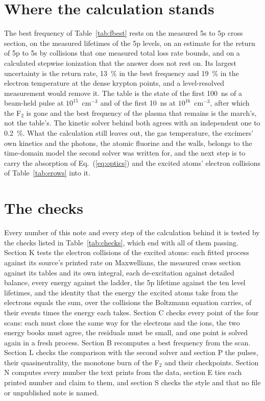 \documentclass[11pt]{article}
\begin{document}
\section{Where the calculation stands}
\label{sec:stands}

The best frequency of Table~\ref{tab:fbest} rests on the measured 5s to 5p cross section, on the measured
lifetimes of the 5p levels, on an estimate for the return of 5p to 5s by collisions that one measured total loss
rate bounds, and on a calculated stepwise ionization that the answer does not rest on. Its largest uncertainty is
the return rate, 13~\% in the best frequency and 19~\% in the electron temperature at the dense krypton points,
and a level-resolved measurement would remove it. The table is the state of the first 100~ns of a beam-held pulse
at $10^{15}$~cm$^{-3}$ and of the first 10~ns at $10^{16}$~cm$^{-3}$, after which the F$_2$ is gone and the best
frequency of the plasma that remains is the march's, not the table's. The kinetic solver behind both agrees with an
independent one to 0.2~\%. What the calculation still leaves out, the gas temperature, the excimers' own kinetics
and the photons, the atomic fluorine and the walls, belongs to the time-domain model the second solver was written
for, and the next step is to carry the absorption of Eq.~(\ref{eq:optics}) and the excited atoms' electron
collisions of Table~\ref{tab:erows} into it.

\FloatBarrier
\appendix
\section{The checks}
\label{app:checks}

Every number of this note and every step of the calculation behind it is tested by the checks listed in
Table~\ref{tab:checks}, which end with all of them passing. Section K tests the electron collisions of the excited
atoms: each fitted process against its source's printed rate on Maxwellians, the measured cross section against
its tables and its own integral, each de-excitation against detailed balance, every energy against the ladder, the
5p lifetime against the ten level lifetimes, and the identity that the energy the excited atoms take from the
electrons equals the sum, over the collisions the Boltzmann equation carries, of their events times the energy
each takes. Section C checks every point of the four scans: each must close the same way for the electrons and the
ions, the two energy books must agree, the residuals must be small, and one point is solved again in a fresh
process. Section B recomputes a best frequency from the scan. Section L checks the comparison with the second
solver and section P the pulses, their quasineutrality, the monotone burn of the F$_2$ and their checkpoints.
Section N computes every number the text prints from the data, section E ties each printed number and claim to
them, and section S checks the style and that no file or unpublished note is named.
\end{document}
